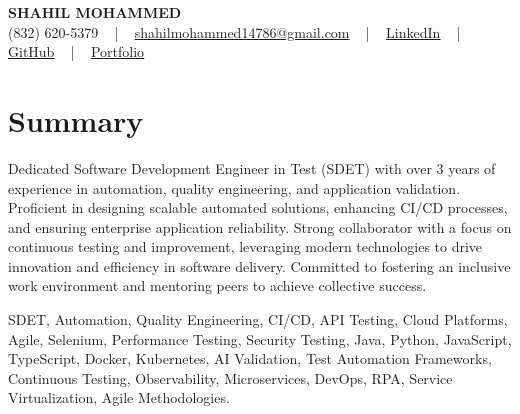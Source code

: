 \documentclass[letterpaper,10pt]{article}
\begin{document}
\begin{center}
    {\fontsize{14pt}{12pt}\selectfont \textbf{\MakeUppercase{Shahil Mohammed}}}\\ \vspace{2pt}
    \fontsize{10pt}{12pt}\selectfont (832) 620-5379 ~ | ~ \href{mailto:shahilmohammed14786@gmail.com}{shahilmohammed14786@gmail.com} ~ | ~  
    \href{https://www.linkedin.com/in/shahil-mohammed-9652931a1/}{\color{blue}\underline{LinkedIn}}  ~ | ~ 
    \href{https://github.com/freakbeast14}{\color{blue}\underline{GitHub}} ~ | ~ 
    \href{https://shahil-mohammed.netlify.app/}{\color{blue}\underline{Portfolio}}
    \vspace{-8pt}
\end{center}

\section{Summary}
\vspace{-2pt}\fontsize{8pt}{9pt}\selectfont
Dedicated Software Development Engineer in Test (SDET) with over 3 years of experience in automation, quality engineering, and application validation. Proficient in designing scalable automated solutions, enhancing CI/CD processes, and ensuring enterprise application reliability. Strong collaborator with a focus on continuous testing and improvement, leveraging modern technologies to drive innovation and efficiency in software delivery. Committed to fostering an inclusive work environment and mentoring peers to achieve collective success.
 \vspace{-5pt}
 
{\fontsize{1pt}{1pt}\selectfont\color{white}
SDET, Automation, Quality Engineering, CI/CD, API Testing, Cloud Platforms, Agile, Selenium, Performance Testing, Security Testing, Java, Python, JavaScript, TypeScript, Docker, Kubernetes, AI Validation, Test Automation Frameworks, Continuous Testing, Observability, Microservices, DevOps, RPA, Service Virtualization, Agile Methodologies.
}
\vspace{-8pt}

\vspace{-2pt}
\end{document}
